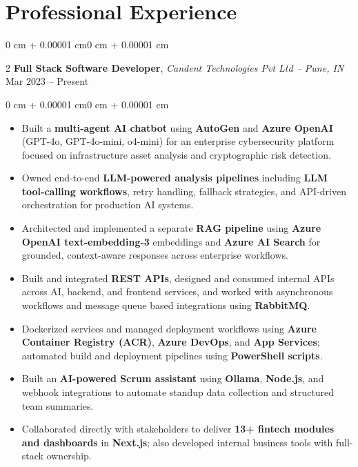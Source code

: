 \documentclass[10pt, letterpaper]{article}
\newenvironment{highlights}{
    \begin{itemize}[
        topsep=0.10 cm,
        parsep=0.10 cm,
        partopsep=0pt,
        itemsep=0pt,
        leftmargin=0 cm + 10pt
    ]
}{\end{itemize}}
\newenvironment{onecolentry}{
    \begin{adjustwidth}{0 cm + 0.00001 cm}{0 cm + 0.00001 cm}
}{\end{adjustwidth}}
\newenvironment{twocolentry}[2][]{
    \onecolentry
    \def\secondColumn{#2}
    \setcolumnwidth{\fill, 4.5 cm}
    \begin{paracol}{2}
}{
    \switchcolumn \raggedleft \secondColumn
    \end{paracol}
    \endonecolentry
}
\begin{document}
  


    \section{Professional Experience}


\begin{twocolentry}{Mar 2023 -- Present} \textbf{Full Stack Software Developer}, \textit{Candent Technologies Pvt Ltd -- Pune, IN} \end{twocolentry} \vspace{0.10 cm} \begin{onecolentry} \begin{highlights} \item Built a \textbf{multi-agent AI chatbot} using \textbf{AutoGen} and \textbf{Azure OpenAI} (GPT-4o, GPT-4o-mini, o4-mini) for an enterprise cybersecurity platform focused on infrastructure asset analysis and cryptographic risk detection. \item Owned end-to-end \textbf{LLM-powered analysis pipelines} including \textbf{LLM tool-calling workflows}, retry handling, fallback strategies, and API-driven orchestration for production AI systems. \item Architected and implemented a separate \textbf{RAG pipeline} using \textbf{Azure OpenAI text-embedding-3} embeddings and \textbf{Azure AI Search} for grounded, context-aware responses across enterprise workflows.\item Built and integrated \textbf{REST APIs}, designed and consumed internal APIs across AI, backend, and frontend services, and worked with asynchronous workflows and message queue based integrations using \textbf{RabbitMQ}. \item Dockerized services and managed deployment workflows using \textbf{Azure Container Registry (ACR)}, \textbf{Azure DevOps}, and \textbf{App Services}; automated build and deployment pipelines using \textbf{PowerShell scripts}. \item Built an \textbf{AI-powered Scrum assistant} using \textbf{Ollama}, \textbf{Node.js}, and webhook integrations to automate standup data collection and structured team summaries. \item Collaborated directly with stakeholders to deliver \textbf{13+ fintech modules and dashboards} in \textbf{Next.js}; also developed internal business tools with full-stack ownership. \end{highlights} \end{onecolentry}
\end{document}

